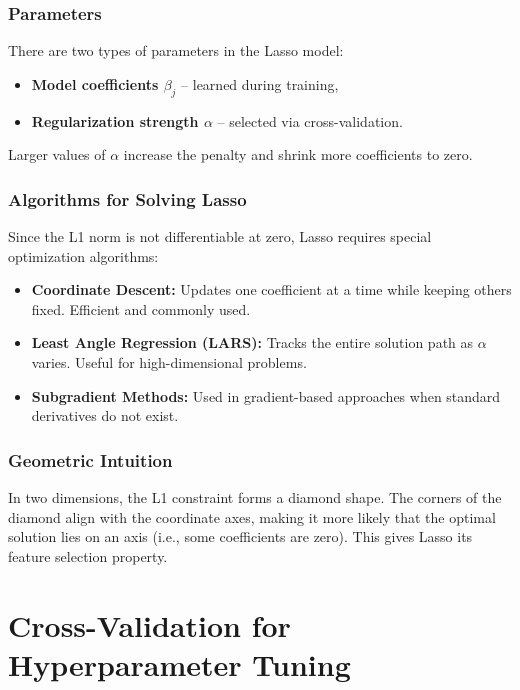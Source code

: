 \documentclass[12pt, a4paper]{report}
\begin{document}
\subsubsection*{Parameters}

There are two types of parameters in the Lasso model:
\begin{itemize}
    \item \textbf{Model coefficients \( \beta_j \)} – learned during training,
    \item \textbf{Regularization strength \( \alpha \)} – selected via cross-validation.
\end{itemize}

Larger values of \( \alpha \) increase the penalty and shrink more coefficients to zero.

\subsubsection*{Algorithms for Solving Lasso}

Since the L1 norm is not differentiable at zero, Lasso requires special optimization algorithms:

\begin{itemize}
    \item \textbf{Coordinate Descent:} Updates one coefficient at a time while keeping others fixed. Efficient and commonly used.
    \item \textbf{Least Angle Regression (LARS):} Tracks the entire solution path as \( \alpha \) varies. Useful for high-dimensional problems.
    \item \textbf{Subgradient Methods:} Used in gradient-based approaches when standard derivatives do not exist.
\end{itemize}

\subsubsection*{Geometric Intuition}

In two dimensions, the L1 constraint forms a diamond shape. The corners of the diamond align with the coordinate axes, making it more likely that the optimal solution lies on an axis (i.e., some coefficients are zero). This gives Lasso its feature selection property.

\section{ Cross-Validation for Hyperparameter Tuning}
\end{document}

